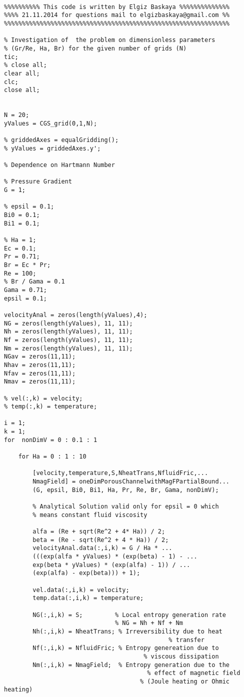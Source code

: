 \begin{lstlisting}

%%%%%%%%%% This code is written by Elgiz Baskaya %%%%%%%%%%%%%%
%%%% 21.11.2014 for questions mail to elgizbaskaya@gmail.com %%
%%%%%%%%%%%%%%%%%%%%%%%%%%%%%%%%%%%%%%%%%%%%%%%%%%%%%%%%%%%%%%%

% Investigation of  the problem on dimensionless parameters 
% (Gr/Re, Ha, Br) for the given number of grids (N)
tic;
% close all;
clear all;
clc;
close all;


N = 20;
yValues = CGS_grid(0,1,N);    

% griddedAxes = equalGridding();
% yValues = griddedAxes.y';

% Dependence on Hartmann Number

% Pressure Gradient
G = 1;

% epsil = 0.1;
Bi0 = 0.1;
Bi1 = 0.1;

% Ha = 1;
Ec = 0.1;
Pr = 0.71;
Br = Ec * Pr;
Re = 100;
% Br / Gama = 0.1
Gama = 0.71;
epsil = 0.1;

velocityAnal = zeros(length(yValues),4);
NG = zeros(length(yValues), 11, 11); 
Nh = zeros(length(yValues), 11, 11); 
Nf = zeros(length(yValues), 11, 11); 
Nm = zeros(length(yValues), 11, 11); 
NGav = zeros(11,11);
Nhav = zeros(11,11);
Nfav = zeros(11,11);
Nmav = zeros(11,11);

% vel(:,k) = velocity;
% temp(:,k) = temperature;

i = 1;
k = 1;
for  nonDimV = 0 : 0.1 : 1

    for Ha = 0 : 1 : 10

        [velocity,temperature,S,NheatTrans,NfluidFric,...
        NmagField] = oneDimPorousChannelwithMagFPartialBound...
        (G, epsil, Bi0, Bi1, Ha, Pr, Re, Br, Gama, nonDimV);

        % Analytical Solution valid only for epsil = 0 which 
        % means constant fluid viscosity
        
        alfa = (Re + sqrt(Re^2 + 4* Ha)) / 2;
        beta = (Re - sqrt(Re^2 + 4 * Ha)) / 2;
        velocityAnal.data(:,i,k) = G / Ha * ...
        (((exp(alfa * yValues) * (exp(beta) - 1) - ...
        exp(beta * yValues) * (exp(alfa) - 1)) / ...
        (exp(alfa) - exp(beta))) + 1);

        vel.data(:,i,k) = velocity;
        temp.data(:,i,k) = temperature;
        
        NG(:,i,k) = S;         % Local entropy generation rate 
                               % NG = Nh + Nf + Nm
        Nh(:,i,k) = NheatTrans; % Irreversibility due to heat 
                                              % transfer
        Nf(:,i,k) = NfluidFric; % Entropy genereation due to 
        					           % viscous dissipation
        Nm(:,i,k) = NmagField;  % Entropy generation due to the 
        						        % effect of magnetic field 
						              % (Joule heating or Ohmic heating)
        

\end{lstlisting}

